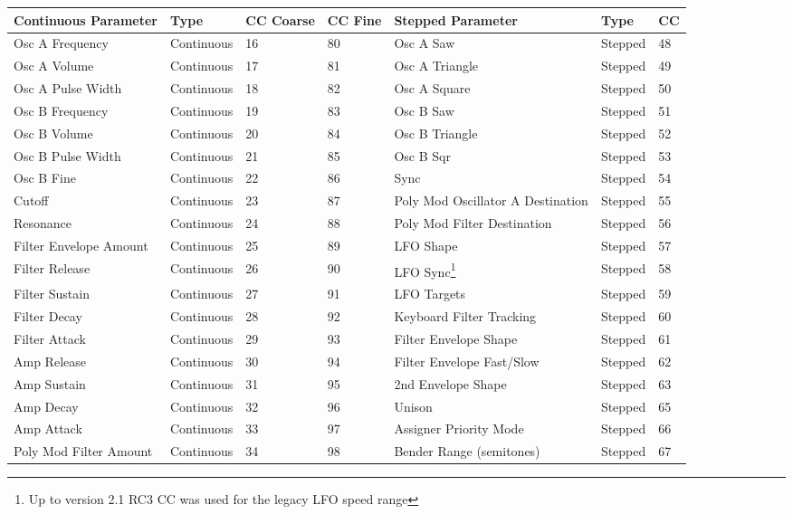 \begin{longtable}[l]{ p{5cm}|p{2cm}|p{1.5cm}|p{1.5cm}|p{5cm}|p{2cm}|p{1cm}} 
\textbf{Continuous Parameter} & \textbf{Type} & \textbf{CC Coarse} & \textbf{CC Fine} & \textbf{Stepped Parameter} & \textbf{Type} & \textbf{CC} \\ \hline
Osc A Frequency & Continuous & 16 & 80 & Osc A Saw & Stepped & 48 \\ \hline
Osc A Volume & Continuous & 17 & 81 & Osc A Triangle & Stepped & 49 \\ \hline
Osc A Pulse Width & Continuous & 18 & 82 & Osc A Square & Stepped & 50 \\ \hline
Osc B Frequency & Continuous & 19 & 83 & Osc B Saw & Stepped & 51 \\ \hline
Osc B Volume & Continuous & 20 & 84 & Osc B Triangle & Stepped & 52 \\ \hline
Osc B Pulse Width & Continuous & 21 & 85 & Osc B Sqr & Stepped & 53 \\ \hline
Osc B Fine & Continuous & 22 & 86 & Sync & Stepped & 54 \\ \hline
Cutoff & Continuous & 23 & 87 & Poly Mod Oscillator A Destination & Stepped & 55 \\ \hline
Resonance & Continuous & 24 & 88 & Poly Mod Filter Destination & Stepped & 56 \\ \hline
Filter Envelope Amount & Continuous & 25 & 89 & LFO Shape & Stepped & 57 \\ \hline
Filter Release & Continuous & 26 & 90 & LFO Sync\footnote{Up to version 2.1 RC3 CC was used for the legacy LFO speed range} & Stepped & 58 \\ \hline
Filter Sustain & Continuous & 27 & 91 & LFO Targets & Stepped & 59 \\ \hline
Filter Decay & Continuous & 28 & 92 & Keyboard Filter Tracking & Stepped & 60 \\ \hline
Filter Attack & Continuous & 29 & 93 & Filter Envelope Shape & Stepped & 61 \\ \hline
Amp Release & Continuous & 30 & 94 & Filter Envelope Fast/Slow & Stepped & 62 \\ \hline
Amp Sustain & Continuous & 31 & 95 & 2nd Envelope Shape & Stepped & 63 \\ \hline
Amp Decay & Continuous & 32 & 96 & Unison & Stepped & 65 \\ \hline
Amp Attack & Continuous & 33 & 97 & Assigner Priority Mode & Stepped & 66 \\ \hline
Poly Mod Filter Amount & Continuous & 34 & 98 & Bender Range (semitones) & Stepped & 67 \\ \hline

\end{longtable}
